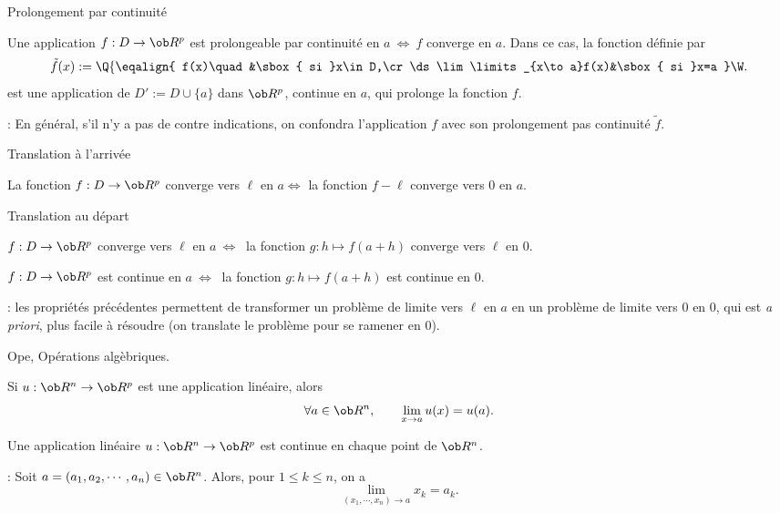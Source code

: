 \Concept [Index=Fonctions!Prolongement par continuité] Prolongement par continuité

Une application $f:D\to\ob R^p$ est prolongeable par continuité en $a\ \Longleftrightarrow\ f$ converge en $a$. 
Dans ce cas, la fonction définie par 
$$
\tilde f(x):=\Q\{
\eqalign{
f(x)\quad &\sbox{ si }x\in D,\cr
\ds \lim\limits_{x\to a}f(x)&\sbox{ si }x=a
}
\W.
$$
est une application de $D':=D\cup\{a\}$ dans $\ob R^p$, continue en $a$, qui prolonge la fonction $f$. 

\Remarque : En général, s'il n'y a pas de contre indications, on confondra l'application $f$ avec son prolongement pas continuité $\tilde f$. 
\bigskip

%


\Concept [Index=Fonctions!Translation à l'arrivée] Translation à l'arrivée


La fonction $f:D\to\ob R^p$ converge vers $\ell$ en $a\Longleftrightarrow$ la fonction $f-\ell$ converge vers $0$ en $a$. 


\Concept [Index=Fonctions!Translation au départ] Translation au départ

$f:D\to\ob R^p$ converge vers $\ell$ en $a\ \Longleftrightarrow\ $ la fonction $g:h\mapsto f(a+h)$ converge vers $\ell$ en $0$. 

\Invertedtrue

\Propriete[$D\subset\ob R^n$, $a\in\ob R^n$] 
$f:D\to\ob R^p$ est continue en $a\ \Longleftrightarrow\ $ la fonction $g:h\mapsto f(a+h)$ est continue en $0$. 

\Remarque : les propriétés précédentes permettent de transformer un problème de limite vers $\ell$ en $a$ 
en un problème de limite vers $0$ en $0$, qui est {\it a priori}, plus facile à résoudre (on translate le problème pour se ramener en $0$). 
\bigskip


\Subsection Ope, Opérations algèbriques. 

\Theoreme 
Si $u:\ob R^n\to\ob R^p$ est une application linéaire, alors
$$
\forall a\in\ob R^n, \qquad \lim_{x\to a}u(x)=u(a). 
$$

\Invertedtrue
\Theoreme 
Une application linéaire $u:\ob R^n\to\ob R^p$ est continue en chaque point de $\ob R^n$. 


\Remarque : Soit $a=(a_1,a_2,\cdots,a_n)\in\ob R^n$. Alors, pour $1\le k\le n$, on a 
$$
\lim_{(x_1,\cdots,x_n)\to a}x_k=a_k. 
$$

